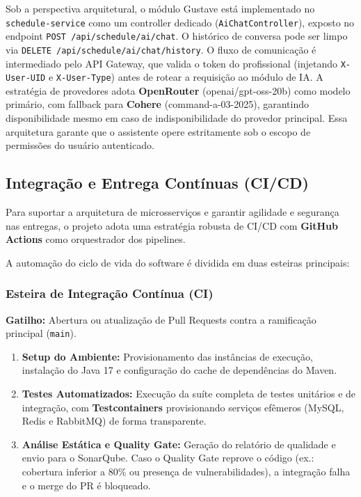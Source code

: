 \documentclass[
    12pt, 
    a4paper, 
    oneside, 
    chapter=TITLE, 
    section=TITLE
]{abntex2}
\begin{document}
Sob a perspectiva arquitetural, o módulo Gustave está implementado no \texttt{schedule-service} como um controller dedicado (\texttt{AiChatController}), exposto no endpoint \texttt{POST /api/schedule/ai/chat}. O histórico de conversa pode ser limpo via \texttt{DELETE /api/schedule/ai/chat/history}. O fluxo de comunicação é intermediado pelo API Gateway, que valida o token do profissional (injetando \texttt{X-User-UID} e \texttt{X-User-Type}) antes de rotear a requisição ao módulo de IA. A estratégia de provedores adota \textbf{OpenRouter} (openai/gpt-oss-20b) como modelo primário, com fallback para \textbf{Cohere} (command-a-03-2025), garantindo disponibilidade mesmo em caso de indisponibilidade do provedor principal. Essa arquitetura garante que o assistente opere estritamente sob o escopo de permissões do usuário autenticado.

\subsection{Integração e Entrega Contínuas (CI/CD)}
Para suportar a arquitetura de microsserviços e garantir agilidade e segurança nas entregas, o projeto adota uma estratégia robusta de CI/CD com \textbf{GitHub Actions} como orquestrador dos pipelines.

A automação do ciclo de vida do software é dividida em duas esteiras principais:

\subsubsection{Esteira de Integração Contínua (CI)}
\textbf{Gatilho:} Abertura ou atualização de Pull Requests contra a ramificação principal (\texttt{main}).
\begin{enumerate}
    \item \textbf{Setup do Ambiente:} Provisionamento das instâncias de execução, instalação do Java 17 e configuração do cache de dependências do Maven.
    \item \textbf{Testes Automatizados:} Execução da suíte completa de testes unitários e de integração, com \textbf{Testcontainers} provisionando serviços efêmeros (MySQL, Redis e RabbitMQ) de forma transparente.
    \item \textbf{Análise Estática e Quality Gate:} Geração do relatório de qualidade e envio para o SonarQube. Caso o Quality Gate reprove o código (ex.: cobertura inferior a 80\% ou presença de vulnerabilidades), a integração falha e o merge do PR é bloqueado.
\end{enumerate}
\end{document}
